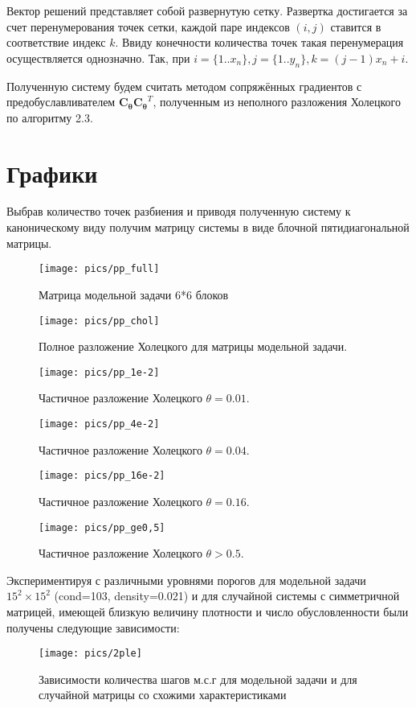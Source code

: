 Вектор решений представляет собой развернутую сетку. Развертка достигается за счет перенумерования точек сетки, каждой паре индексов $(i, j)$ ставится в соответствие индекс $k$. Ввиду конечности количества точек такая перенумерация осуществляется однозначно. Так, при $i = \{1..x_n\}, j = \{1..y_n\}, k = (j - 1) x_n + i$.

Полученную систему будем считать методом сопряжённых градиентов с предобуславливателем $\mathbf{C_\theta C_\theta}^T$, полученным из неполного разложения Холецкого по алгоритму 2.3.

\clearpage

\section{Графики}

Выбрав количество точек разбиения и приводя полученную систему к каноническому виду получим матрицу системы в виде блочной пятидиагональной матрицы.

\begin{figure}[H]
    \centering
    \texttt{[image: pics/pp\_full]}
    \caption{Матрица модельной задачи 6*6 блоков}
\end{figure}
\begin{figure}[H]
    \centering
    \texttt{[image: pics/pp\_chol]}
    \caption{Полное разложение Холецкого для матрицы модельной задачи.}
\end{figure}
\begin{figure}[H]
    \centering
    \texttt{[image: pics/pp\_1e-2]}
    \caption{Частичное разложение Холецкого $\theta=0.01$.}
\end{figure}
\begin{figure}[H]
    \centering
    \texttt{[image: pics/pp\_4e-2]}
    \caption{Частичное разложение Холецкого $\theta=0.04$.}
\end{figure}
\begin{figure}[H]
    \centering
    \texttt{[image: pics/pp\_16e-2]}
    \caption{Частичное разложение Холецкого $\theta=0.16$.}
\end{figure}
\begin{figure}[H]
    \centering
    \texttt{[image: pics/pp\_ge0,5]}
    \caption{Частичное разложение Холецкого $\theta>0.5$.}
\end{figure}

\clearpage
Экспериментируя с различными уровнями порогов для модельной задачи $15^2\times15^2$ (cond=103, density=0.021) и для случайной системы с симметричной матрицей, имеющей близкую величину плотности и число обусловленности были получены следующие зависимости:
\begin{figure}[H]
    \centering
    \texttt{[image: pics/2ple]}
    \caption{Зависимости количества шагов м.с.г для модельной задачи и для случайной матрицы со схожими характеристиками}
\end{figure}


